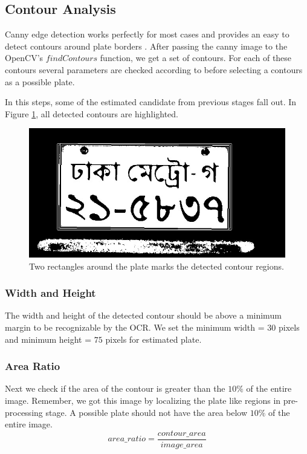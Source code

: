\documentclass{standalone}
\begin{document}
\subsection{Contour Analysis}
Canny edge detection works perfectly for most cases and provides an easy to detect contours around plate borders \cite{alshahrani2013real}. After passing the canny image to the OpenCV's $findContours$ function, we get a set of contours. For each of these contours several parameters are checked according to \cite{alshahrani2013real} before selecting a contours as a possible plate. 

In this steps, some of the estimated candidate from previous stages fall out. In Figure \ref{fig:ContourImage}, all detected contours are highlighted.
\begin{figure}
    \centering
    \includegraphics[width=.7\linewidth]{./img/sample/stage9.jpg}
    \caption{Two rectangles around the plate marks the detected contour regions.}
    \label{fig:ContourImage}
\end{figure}



\subsubsection{Width and Height}
The width and height of the detected contour should be above a minimum margin to be recognizable by the OCR. We set the minimum width = $30$ pixels and minimum height = $75$ pixels for estimated plate.

\subsubsection{Area Ratio}
Next we check if the area of the contour is greater than the $10\%$ of the entire image. Remember, we got this image by localizing the plate like regions in pre-processing stage. A possible plate should not have the area below $10\%$ of the entire image.
\begin{equation}
area\_ratio = \dfrac{contour\_area}{image\_area }
\end{equation}
\end{document}
